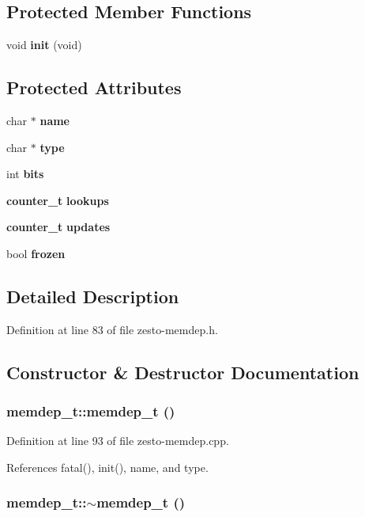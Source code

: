 \subsection*{Protected Member Functions}
\begin{CompactItemize}
\item 
void {\bf init} (void)
\end{CompactItemize}
\subsection*{Protected Attributes}
\begin{CompactItemize}
\item 
char $\ast$ {\bf name}
\item 
char $\ast$ {\bf type}
\item 
int {\bf bits}
\item 
{\bf counter\_\-t} {\bf lookups}
\item 
{\bf counter\_\-t} {\bf updates}
\item 
bool {\bf frozen}
\end{CompactItemize}


\subsection{Detailed Description}


Definition at line 83 of file zesto-memdep.h.

\subsection{Constructor \& Destructor Documentation}
\subsubsection[{memdep\_\-t}]{\setlength{\rightskip}{0pt plus 5cm}memdep\_\-t::memdep\_\-t ()}\label{classmemdep__t_176617a9d11aa93dce9cc38c39d4262f}




Definition at line 93 of file zesto-memdep.cpp.

References fatal(), init(), name, and type.
\subsubsection[{$\sim$memdep\_\-t}]{\setlength{\rightskip}{0pt plus 5cm}memdep\_\-t::$\sim$memdep\_\-t ()\hspace{0.3cm}{\tt  [virtual]}}\label{classmemdep__t_610b94ef3aa02c0c8b86d9d73b04edf5}




